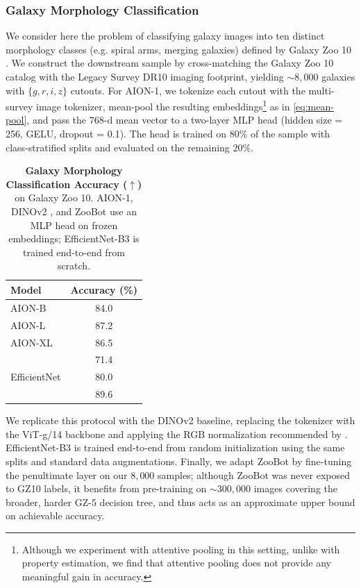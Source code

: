 \documentclass[]{polymathic}
\begin{document}
\subsubsection{Galaxy Morphology Classification}
\label{sec:galaxy-morphology-classification}

We consider here the problem of classifying galaxy images into ten distinct morphology classes (e.g. spiral arms, merging galaxies) defined by Galaxy Zoo 10 \citep[GZ10;]{walmsley2022galaxy,Leung_2018gz10}. We construct the downstream sample by cross-matching the Galaxy Zoo 10 catalog with the Legacy Survey DR10 imaging footprint, yielding $\sim 8,000$ galaxies with $\{g, r, i, z\}$ cutouts. For AION-1, we tokenize each cutout with the multi-survey image tokenizer, mean-pool the resulting embeddings\footnote{Although we experiment with attentive pooling in this setting, unlike with property estimation, we find that attentive pooling does not provide any meaningful gain in accuracy.} as in \autoref{eq:mean-pool}, and pass the 768-d mean vector to a two-layer MLP head (hidden size = 256, GELU, dropout = 0.1). The head is trained on $80\%$ of the sample with class-stratified splits and evaluated on the remaining $20\%$.

\begin{table}
  \centering
  \small
  \begin{tabular}{lc}
    \toprule
    \textbf{Model} & \textbf{Accuracy (\%)} \\
    \midrule
    AION-B        & 84.0 \\
    AION-L        & 87.2 \\
    AION-XL       & 86.5 \\
    \midrule
    \cite{oquab2023dinov2}        & 71.4 \\
    \midrule
    EfficientNet  & 80.0 \\
    \cite{walmsley2022galaxy}        & 89.6 \\
    \bottomrule
  \end{tabular}
  \caption{\textbf{Galaxy Morphology Classification Accuracy ($\uparrow$)} on Galaxy Zoo 10. AION-1, DINOv2 \citep{oquab2023dinov2}, and ZooBot \citep{walmsley2022galaxy} use an MLP head on frozen embeddings; EfficientNet-B3 \citep{tan2019efficientnet} is trained end-to-end from scratch.}
  \label{tab:wrap_acc}
\end{table}


We replicate this protocol with the DINOv2 baseline, replacing the tokenizer with the ViT-g/14 backbone and applying the RGB normalization recommended by \citet{oquab2023dinov2}. EfficientNet-B3 is trained end-to-end from random initialization using the same splits and standard data augmentations. Finally, we adapt ZooBot \citep{walmsley2022galaxy} by fine-tuning the penultimate layer on our $8,000$ samples; although ZooBot was never exposed to GZ10 labels, it benefits from pre-training on $\sim 300,000$ images covering the broader, harder GZ-5 decision tree, and thus acts as an approximate upper bound on achievable accuracy.
\end{document}
